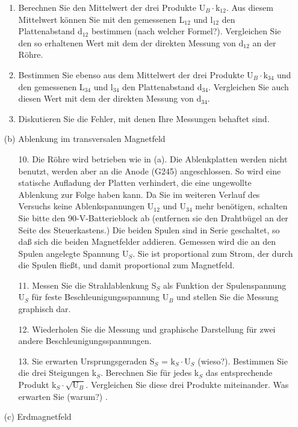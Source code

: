 \documentclass[12pt]{scrartcl}
\begin{document}
\begin{itemize}
\begin{enumerate}
\item
Berechnen Sie den Mittelwert der drei Produkte U$_B\cdot$k$_{12}$. Aus diesem Mittelwert können Sie mit den gemessenen L$_{12}$ und l$_{12}$ den Plattenabstand d$_{12}$ bestimmen (nach welcher Formel?). Vergleichen Sie den so erhaltenen Wert mit dem der direkten Messung von d$_{12}$ an der Röhre.
\item
Bestimmen Sie ebenso aus dem Mittelwert der drei Produkte U$_B\cdot$k$_{34}$ und den
gemessenen L$_{34}$ und l$_{34}$ den Plattenabstand d$_{34}$. Vergleichen Sie auch diesen Wert mit dem der direkten Messung von d$_{34}$.
\item
Diskutieren Sie die Fehler, mit denen Ihre Messungen behaftet sind.
\end{enumerate}
\item[(b)] Ablenkung im transversalen Magnetfeld
\newline
\begin{enumerate}
\item[10.]
Die Röhre wird betrieben wie in (a). Die Ablenkplatten werden nicht benutzt, werden aber an die Anode (G245) angeschlossen. So wird eine statische Aufladung der Platten verhindert, die eine ungewollte Ablenkung zur Folge haben kann. Da Sie im weiteren Verlauf des Versuchs keine Ablenkspannungen
U$_{12}$ und U$_{34}$ mehr benötigen, schalten Sie bitte den 90-V-Batterieblock ab (entfernen sie den Drahtbügel
an der Seite des Steuerkastens.) Die beiden Spulen sind in Serie geschaltet, so daß sich die beiden Magnetfelder addieren. Gemessen wird die an den Spulen angelegte Spannung U$_S$. Sie ist proportional zum Strom, der durch die Spulen fließt, und damit proportional zum Magnetfeld.
\item[11.]
Messen Sie die Strahlablenkung S$_S$ als Funktion der Spulenspannung U$_S$ für feste
Beschleunigungsspannung U$_B$
und stellen Sie die Messung graphisch dar.
\item[12.]
Wiederholen Sie die Messung und graphische Darstellung für zwei andere Beschleunigungsspannungen.
\item[13.]
Sie erwarten Ursprungsgeraden S$_S$ = k$_S\cdot$U$_S$ (wieso?). Bestimmen Sie die drei Steigungen k$_S$. Berechnen Sie für jedes k$_S$
das entsprechende Produkt k$_S\cdot\sqrt{\text{U}_B}$. Vergleichen Sie
diese drei Produkte miteinander. Was erwarten Sie (warum?)
.
\end{enumerate}
\item[(c)] Erdmagnetfeld
\newline
\begin{enumerate}

\end{enumerate}
\end{itemize}
\end{document}
